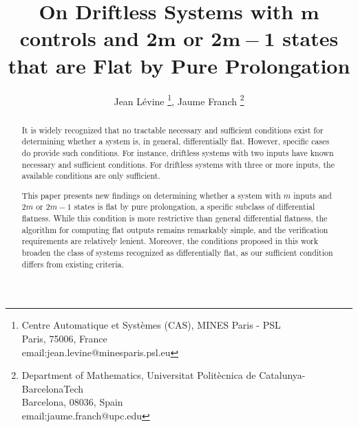 \documentclass[10pt]{article}
\newcommand{\3}{\mathbf{3}}
\newcommand{\2}{\mathbf{2}}
\newcommand{\1}{\mathbf{1}}
\newcommand{\0}{\mathbf{0}}
\begin{document}

%
%

\title{On Driftless Systems with $\mathbf{m}$ controls and $\mathbf{2m}$ or $\mathbf{2m-1}$ states that are Flat by Pure Prolongation}

\author{Jean L\'evine \footnote{Centre Automatique et Syst\`emes (CAS), MINES Paris - PSL\\Paris, 75006, France\\email:jean.levine@minesparis.psl.eu},
Jaume Franch \footnote{Department of Mathematics, Universitat Polit\`ecnica de Catalunya-BarcelonaTech \\
Barcelona, 08036, Spain\\
email:jaume.franch@upc.edu}}




\maketitle

\begin{abstract}
It is widely recognized that no tractable necessary and sufficient conditions exist for determining whether a system is, in general, differentially flat. However, specific cases do provide such conditions. For instance, driftless systems with two inputs have known necessary and sufficient conditions. For driftless systems with three or more inputs, the available conditions are only sufficient.

This paper presents new findings on determining whether a system with $m$ inputs and $2m$ or $2m-1$ states is flat by pure prolongation, a specific subclass of differential flatness. While this condition is more restrictive than general differential flatness, the algorithm for computing flat outputs remains remarkably simple, and the verification requirements are relatively lenient. Moreover, the conditions proposed in this work broaden the class of systems recognized as differentially flat, as our sufficient condition differs from existing criteria.
\end{abstract}
\end{document}
